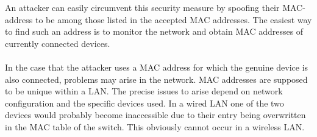 An attacker can easily circumvent this security measure by spoofing their MAC-address to be among those listed in the accepted MAC addresses. The easiest way to find such an address is to monitor the network and obtain MAC addresses of currently connected devices.  \\ \\In the case that the attacker uses a MAC address for which the genuine device is also connected, problems may arise in the network. MAC addresses are supposed to be unique within a LAN. The precise issues to arise depend on network configuration and the specific devices used. In a wired LAN one of the two devices would probably become inaccessible due to their entry being overwritten in the MAC table of the switch. This obviously cannot occur in a wireless LAN.

